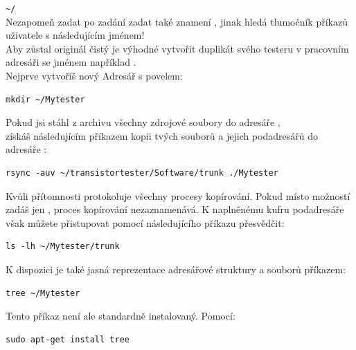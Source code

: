 \verb"~/"\\
Nezapomeň zadat po zadání \lname{\textasciitilde} zadat také znamení \lname{/} , jinak hledá tlumočník příkazů uživatele s následujícím jménem!\\   
Aby zůstal originál čistý je výhodné vytvořit duplikát svého testeru v pracovním adresáři se jménem například .\\
Nejprve vytvoříš nový Adresář s povelem:
\begin{large} \vspace{-0.4em} \begin{verbatim}
mkdir ~/Mytester
\end{verbatim} \end{large}

Pokud jsi stáhl z  archivu všechny zdrojové soubory do adresáře ,\\
získáš následujícím příkazem kopii tvých souborů a jejich podadresářů do adresáře : 
\begin{large} \vspace{-0.4em} \begin{verbatim}
rsync -auv ~/transistortester/Software/trunk ./Mytester
\end{verbatim} \end{large}

Kvůli přítomnosti  protokoluje  všechny procesy kopírování.
Pokud místo možností  zadáš jen , proces kopírování nezaznamenává.
K naplněnému kufru podadresáře však můžete přistupovat pomocí následujícího příkazu
přesvědčit: 
\begin{large} \vspace{-0.4em} \begin{verbatim}
ls -lh ~/Mytester/trunk
\end{verbatim} \end{large}

K dispozici je také jasná reprezentace adresářové struktury a souborů příkazem:
\begin{large} \vspace{-0.4em} \begin{verbatim}
tree ~/Mytester
\end{verbatim} \end{large}

Tento příkaz není ale standardně instalovaný. Pomocí:
\begin{large} \vspace{-0.4em} \begin{verbatim}
sudo apt-get install tree
\end{verbatim} \end{large}

